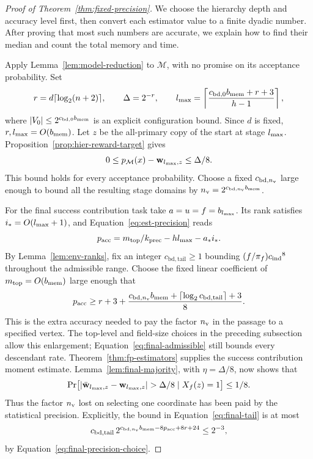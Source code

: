 \documentclass[11pt]{article}
\numberwithin{equation}{section}
\theoremstyle{definition}
\theoremstyle{remark}
\begin{document}
\begin{proof}[Proof of Theorem~\ref{thm:fixed-precision}]
We choose the hierarchy depth and accuracy level first, then convert each estimator value to a finite dyadic number. After proving that most such numbers are accurate, we explain how to find their median and count the total memory and time.

Apply Lemma~\ref{lem:model-reduction} to $\mathcal M$, with no promise
on its acceptance probability. Set
\[
 r=d\lceil\log_2(n+2)\rceil,\qquad \Delta=2^{-r},\qquad
 {l_{\rm max}}=\left\lceil\frac{{c_{\mathrm{bd},0}}{b_{\rm mem}}+r+3}{{h}-1}\right\rceil,
\]
where $|V_0|\le2^{{c_{\mathrm{bd},0}}{b_{\rm mem}}}$ is an explicit configuration bound.
Since $d$ is fixed, $r,{l_{\rm max}}=O({b_{\rm mem}})$. Let $z$ be the all-primary copy of
the start at stage ${l_{\rm max}}$. Proposition~\ref{prop:hier-reward-target}
gives
\begin{equation}\label{eq:final-hierarchy-accuracy}
 0\le p_{\mathcal M}(x)-{\mathbf{w}}_{l_{\rm max},z}\le\Delta/8.
\end{equation}
This bound holds for every acceptance probability. Choose a fixed
${c_{\mathrm{bd},n_{\rm v}}}$ large enough to bound all the resulting stage domains by
${n_{\rm v}}=2^{{c_{\mathrm{bd},n_{\rm v}}}{b_{\rm mem}}}$.

For the final success contribution task take $a=u=f=b_{l_{\rm max}}$. Its rank satisfies
$i_*=O({l_{\rm max}}+1)$, and Equation~\eqref{eq:est-precision} reads
\[
 {p_{\rm acc}}={m}_{\mathrm{top}}/{k}_{\mathrm{prec}}-{h}{l_{\rm max}}-{a}_*i_*.
\]
By Lemma~\ref{lem:env-ranks}, fix an integer ${c_{\mathrm{bd},\mathrm{tail}}}\ge1$ bounding
$(f/\pi_f){c_{\rm ind}}^8$ throughout the admissible range. Choose the fixed
linear coefficient of ${m}_{\mathrm{top}}=O({b_{\rm mem}})$ large enough that
\begin{equation}\label{eq:final-precision-choice}
 {p_{\rm acc}}\ge r+3+\frac{{c_{\mathrm{bd},n_{\rm v}}}{b_{\rm mem}}+\lceil\log_2 {c_{\mathrm{bd},\mathrm{tail}}}\rceil+3}{8}.
\end{equation}
This is the extra accuracy needed to pay the factor ${n_{\rm v}}$ in the passage to a specified vertex. The top-level and field-size choices in the preceding subsection allow this enlargement; Equation~\eqref{eq:final-admissible} still
bounds every descendant rate. Theorem~\ref{thm:fp-estimators}
supplies the success contribution moment estimate. Lemma~\ref{lem:final-majority},
with $\eta=\Delta/8$, now shows that
\begin{equation}\label{eq:final-good-environments}
 \Pr\bigl[|\bar {\mathbf{w}}_{l_{\rm max},z}-{\mathbf{w}}_{l_{\rm max},z}|>\Delta/8
       \mid X_f(z)=1\bigr]\le1/8.
\end{equation}
Thus the factor ${n_{\rm v}}$ lost on selecting one coordinate has been paid
by the statistical precision. Explicitly, the bound in
Equation~\eqref{eq:final-tail} is at most
\[
 {c_{\mathrm{bd},\mathrm{tail}}}\,2^{{c_{\mathrm{bd},n_{\rm v}}}{b_{\rm mem}}-8{p_{\rm acc}}+8r+24}\le 2^{-3},
\]
by Equation~\eqref{eq:final-precision-choice}.


\end{proof}
\end{document}
